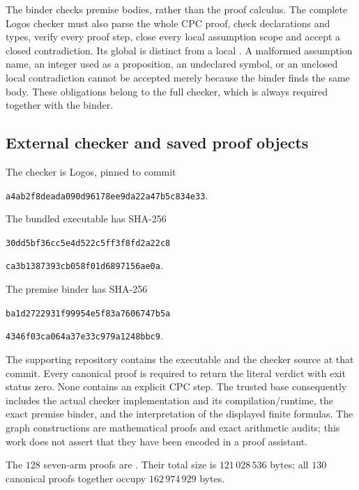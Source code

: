 The binder checks premise bodies, rather than the proof calculus. The complete Logos checker must also parse the whole CPC proof, check declarations and types, verify every proof step, close every local assumption scope and accept a closed contradiction. Its global  is distinct from a local . A malformed assumption name, an integer used as a proposition, an undeclared symbol, or an unclosed local contradiction cannot be accepted merely because the binder finds the same body. These obligations belong to the full checker, which is always required together with the binder.

\subsection{External checker and saved proof objects}
The checker is Logos, pinned to commit
\begin{center}\small\texttt{a4ab2f8deada090d96178ee9da22a47b5c834e33}.\end{center}
The bundled executable has SHA-256
\begin{center}\small\texttt{30dd5bf36cc5e4d522c5ff3f8fd2a22c8}\par
\texttt{ca3b1387393cb058f01d6897156ae0a}.\end{center}
The premise binder has SHA-256
\begin{center}\small\texttt{ba1d2722931f99954e5f83a7606747b5a}\par
\texttt{4346f03ca064a37e33c979a1248bbc9}.\end{center}
The supporting repository contains the executable and the checker source at that commit. Every canonical proof is required to return the literal verdict  with exit status zero. None contains an explicit CPC  step. The trusted base consequently includes the actual checker implementation and its compilation/runtime, the exact premise binder, and the interpretation of the displayed finite formulas. The graph constructions are mathematical proofs and exact arithmetic audits; this work does not assert that they have been encoded in a proof assistant.

The $128$ seven-arm proofs are . Their total size is $121\,028\,536$ bytes; all $130$ canonical proofs together occupy $162\,974\,929$ bytes.

